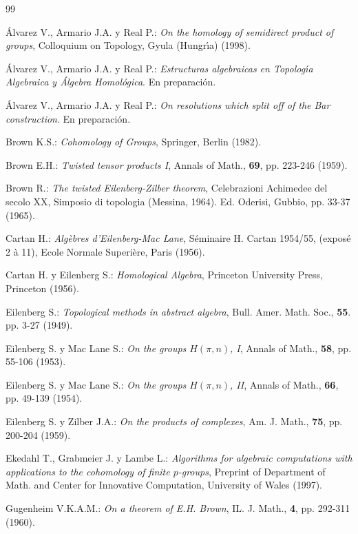 \begin{thebibliography}{99}

 \'{A}lvarez V., Armario J.A. y Real P.: {\em On the
homology of semidirect product of groups}, Colloquium on Topology,
Gyula (Hungr\'{\i}a) (1998).

 \'{A}lvarez V., Armario J.A. y Real P.: {\em
Estructuras algebraicas en Topolog\'{\i}a Algebraica y \'{A}lgebra
Homol\'{o}gica}. En preparaci\'{o}n.

 \'{A}lvarez V., Armario J.A. y Real P.: {\em On
resolutions which split off of the Bar construction}. En
preparaci\'{o}n.

 Brown K.S.: {\em Cohomology of Groups}, Springer,
Berlin (1982).

 Brown E.H.: {\em Twisted tensor products I},
Annals of Math., {\bf 69}, pp. 223-246 (1959).

 Brown R.: {\em The twisted Eilenberg-Zilber theorem},
Celebrazioni Achimedee del secolo XX, Simposio di topologia
(Messina, 1964). Ed. Oderisi, Gubbio, pp. 33-37 (1965).

 Cartan H.: {\em Alg\`ebres d'Eilenberg-Mac Lane},
S\'{e}minaire H. Cartan 1954/55, (expos\'{e} 2 \`a 11), Ecole Normale
Superi\`ere, Paris (1956).

 Cartan H. y Eilenberg S.: {\em Homological Algebra},
Princeton University Press, Princeton (1956).

 Eilenberg S.: {\em Topological methods in abstract
algebra}, Bull. Amer. Math. Soc., {\bf 55}. pp. 3-27 (1949).

 Eilenberg S. y Mac Lane S.: {\em On the groups
$H(\pi, n)$, I}, Annals of Math., {\bf 58}, pp. 55-106 (1953).

 Eilenberg S. y Mac Lane S.: {\em On the groups
$H(\pi, n)$, II}, Annals of Math., {\bf 66}, pp. 49-139 (1954).

 Eilenberg S. y Zilber J.A.: {\em On the products
of complexes}, Am. J. Math., {\bf 75}, pp. 200-204 (1959).

 Ekedahl T., Grabmeier J. y Lambe L.: {\em Algorithms
for algebraic computations with applications to the cohomology of
finite $p$-groups}, Preprint of Department of Math. and Center
for Innovative Computation, University of Wales (1997).

 Gugenheim V.K.A.M.: {\em On a theorem of E.H.
Brown}, IL. J. Math., {\bf 4}, pp. 292-311 (1960).


\end{thebibliography}
